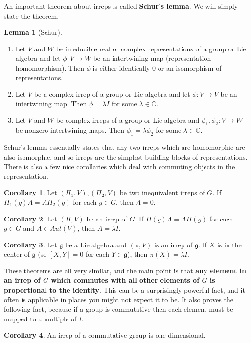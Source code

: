 \documentclass[11pt, oneside]{article}   	%
\theoremstyle{definition}
\newtheorem{corollary}{Corollary}[theorem]
\newtheorem{lemma}[theorem]{Lemma}
\begin{document}
An important theorem about irreps is called \textbf{Schur's lemma}. We will simply state the theorem.
\begin{lemma}[Schur]
	\begin{enumerate}
		\item Let $V$ and $W$ be irreducible real or complex representations of a group or Lie algebra and 
		let $\phi : V\rightarrow W$ be an intertwining map (representation homomorphism). Then $\phi$ 
		is either identically 0 or an isomorphism of representations.
		\item Let $V$ be a complex irrep of a group or Lie algebra and let $\phi : V\rightarrow V$ be an 
		intertwining map. Then $\phi = \lambda I$ for some $\lambda\in\mathbb C$. 
		\item Let $V$ and $W$ be complex irreps of a group or Lie algebra and $\phi_1, \phi_2 : V\rightarrow 
		W$ be nonzero intertwining maps. Then $\phi_1 = \lambda\phi_2$ for some $\lambda\in\mathbb C$. 
	\end{enumerate}
\end{lemma}
Schur's lemma essentially states that any two irreps which are homomorphic are also isomorphic, and so irreps 
are the simplest building blocks of representations. There is also a few nice corollaries which deal with commuting 
objects in the representation.
\begin{corollary}
	Let $(\Pi_1, V), (\Pi_2, V)$ be two inequivalent irreps of $G$. If $\Pi_1(g) A = A\Pi_2(g)$ for each $g\in G$, then 
	$A = 0$. 
\end{corollary}
\begin{corollary}
	Let $(\Pi, V)$ be an irrep of $G$. If $\Pi(g)A = A\Pi(g)$ for each $g\in G$ and $A\in Aut(V)$, then $A = \lambda I$. 
\end{corollary}
\begin{corollary}
	Let $\mathfrak g$ be a Lie algebra and $(\pi, V)$ is an irrep of $\mathfrak g$. If $X$ is in the center of 
	$\mathfrak g$ (so $[X, Y] = 0$ for each $Y\in\mathfrak g$), then $\pi(X) = \lambda I$. 
\end{corollary}
These theorems are all very similar, and the main point is that \textbf{any element in an irrep of $G$ which commutes 
with all other elements of $G$ is proportional to the identity}. This can be a surprisingly powerful fact, and it often 
is applicable in places you might not expect it to be. It also proves the following fact, because if a group is 
commutative then each element must be mapped to a multiple of $I$. 
\begin{corollary}
	An irrep of a commutative group is one dimensional.
\end{corollary}
\end{document}
